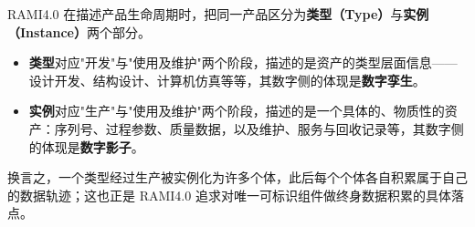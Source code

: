 RAMI4.0 在描述产品生命周期时，把同一产品区分为\textbf{类型（Type）}与\textbf{实例（Instance）}两个部分。
\begin{itemize}
\item \textbf{类型}对应"开发"与"使用及维护"两个阶段，描述的是资产的类型层面信息——设计开发、结构设计、计算机仿真等等，其数字侧的体现是\textbf{数字孪生}。
\item \textbf{实例}对应"生产"与"使用及维护"两个阶段，描述的是一个具体的、物质性的资产：序列号、过程参数、质量数据，以及维护、服务与回收记录等，其数字侧的体现是\textbf{数字影子}。
\end{itemize}
换言之，一个类型经过生产被实例化为许多个体，此后每个个体各自积累属于自己的数据轨迹；这也正是 RAMI4.0 追求对唯一可标识组件做终身数据积累的具体落点。